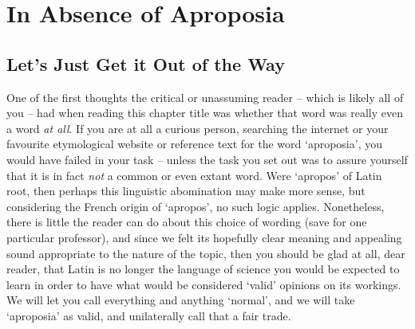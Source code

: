 %
%
%
\chapter{In Absence of Aproposia}
\label{chap:apropos} %



\section{Let's Just Get it Out of the Way}
\label{sec:aproposia-is-not-a-word}
\noindent One of the first thoughts the critical or unassuming reader -- which is likely all of you -- had when reading this chapter title was whether that word was really even a word \emph{at all}. If you are at all a curious person, searching the internet or your favourite etymological website or reference text for the word `aproposia', you would have failed in your task -- unless the task you set out was to assure yourself that it is in fact \emph{not} a common or even extant word. Were `apropos' of Latin root, then perhaps this linguistic abomination may make more sense, but considering the French origin of `apropos', no such logic applies. Nonetheless, there is little the reader can do about this choice of wording (save for one particular professor), and since we felt its hopefully clear meaning and appealing sound appropriate to the nature of the topic, then you should be glad at all, dear reader, that Latin is no longer the language of science you would be expected to learn in order to have what would be considered `valid' opinions on its workings. We will let you call everything and anything `normal', and we will take `aproposia' as valid, and unilaterally call that a fair trade.


